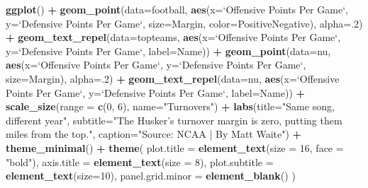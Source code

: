 \documentclass[
]{book}
\newenvironment{Shaded}{\begin{snugshade}}{\end{snugshade}}
\newcommand{\DataTypeTok}[1]{\textcolor[rgb]{0.13,0.29,0.53}{#1}}
\newcommand{\DecValTok}[1]{\textcolor[rgb]{0.00,0.00,0.81}{#1}}
\newcommand{\KeywordTok}[1]{\textcolor[rgb]{0.13,0.29,0.53}{\textbf{#1}}}
\newcommand{\NormalTok}[1]{#1}
\newcommand{\OperatorTok}[1]{\textcolor[rgb]{0.81,0.36,0.00}{\textbf{#1}}}
\newcommand{\StringTok}[1]{\textcolor[rgb]{0.31,0.60,0.02}{#1}}
\begin{document}
\begin{Shaded}
\begin{Highlighting}[]
\KeywordTok{ggplot}\NormalTok{() }\OperatorTok{+}
\StringTok{  }\KeywordTok{geom_point}\NormalTok{(}\DataTypeTok{data=}\NormalTok{football, }\KeywordTok{aes}\NormalTok{(}\DataTypeTok{x=}\StringTok{`}\DataTypeTok{Offensive Points Per Game}\StringTok{`}\NormalTok{, }\DataTypeTok{y=}\StringTok{`}\DataTypeTok{Defensive Points Per Game}\StringTok{`}\NormalTok{, }\DataTypeTok{size=}\NormalTok{Margin, }\DataTypeTok{color=}\NormalTok{PositiveNegative), }\DataTypeTok{alpha=}\NormalTok{.}\DecValTok{2}\NormalTok{) }\OperatorTok{+}
\StringTok{  }\KeywordTok{geom_text_repel}\NormalTok{(}\DataTypeTok{data=}\NormalTok{topteams, }\KeywordTok{aes}\NormalTok{(}\DataTypeTok{x=}\StringTok{`}\DataTypeTok{Offensive Points Per Game}\StringTok{`}\NormalTok{, }\DataTypeTok{y=}\StringTok{`}\DataTypeTok{Defensive Points Per Game}\StringTok{`}\NormalTok{, }\DataTypeTok{label=}\NormalTok{Name)) }\OperatorTok{+}\StringTok{ }
\StringTok{  }\KeywordTok{geom_point}\NormalTok{(}\DataTypeTok{data=}\NormalTok{nu, }\KeywordTok{aes}\NormalTok{(}\DataTypeTok{x=}\StringTok{`}\DataTypeTok{Offensive Points Per Game}\StringTok{`}\NormalTok{, }\DataTypeTok{y=}\StringTok{`}\DataTypeTok{Defensive Points Per Game}\StringTok{`}\NormalTok{, }\DataTypeTok{size=}\NormalTok{Margin), }\DataTypeTok{alpha=}\NormalTok{.}\DecValTok{2}\NormalTok{) }\OperatorTok{+}
\StringTok{  }\KeywordTok{geom_text_repel}\NormalTok{(}\DataTypeTok{data=}\NormalTok{nu, }\KeywordTok{aes}\NormalTok{(}\DataTypeTok{x=}\StringTok{`}\DataTypeTok{Offensive Points Per Game}\StringTok{`}\NormalTok{, }\DataTypeTok{y=}\StringTok{`}\DataTypeTok{Defensive Points Per Game}\StringTok{`}\NormalTok{, }\DataTypeTok{label=}\NormalTok{Name)) }\OperatorTok{+}
\StringTok{  }\KeywordTok{scale_size}\NormalTok{(}\DataTypeTok{range =} \KeywordTok{c}\NormalTok{(}\DecValTok{0}\NormalTok{, }\DecValTok{6}\NormalTok{), }\DataTypeTok{name=}\StringTok{"Turnovers"}\NormalTok{) }\OperatorTok{+}
\StringTok{  }\KeywordTok{labs}\NormalTok{(}\DataTypeTok{title=}\StringTok{"Same song, different year"}\NormalTok{, }\DataTypeTok{subtitle=}\StringTok{"The Husker's turnover margin is zero, putting them miles from the top."}\NormalTok{, }\DataTypeTok{caption=}\StringTok{"Source: NCAA | By Matt Waite"}\NormalTok{)  }\OperatorTok{+}\StringTok{ }\KeywordTok{theme_minimal}\NormalTok{() }\OperatorTok{+}\StringTok{ }
\StringTok{  }\KeywordTok{theme}\NormalTok{(}
    \DataTypeTok{plot.title =} \KeywordTok{element_text}\NormalTok{(}\DataTypeTok{size =} \DecValTok{16}\NormalTok{, }\DataTypeTok{face =} \StringTok{"bold"}\NormalTok{),}
    \DataTypeTok{axis.title =} \KeywordTok{element_text}\NormalTok{(}\DataTypeTok{size =} \DecValTok{8}\NormalTok{), }
    \DataTypeTok{plot.subtitle =} \KeywordTok{element_text}\NormalTok{(}\DataTypeTok{size=}\DecValTok{10}\NormalTok{), }
    \DataTypeTok{panel.grid.minor =} \KeywordTok{element_blank}\NormalTok{()}
\NormalTok{    )}
\end{Highlighting}
\end{Shaded}
\end{document}
